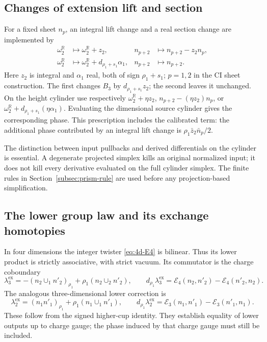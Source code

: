 \subsection{Changes of extension lift and section}
For a fixed sheet $n_p$, an integral lift change and a real section change are implemented by
\begin{align}\label{eq:background-changes}
 \omega_2^{\mathbb R}&\longmapsto\omega_2^{\mathbb R}+z_2,
 &n_{p+2}&\longmapsto n_{p+2}-z_2n_p,\\
 \omega_2^{\mathbb R}&\longmapsto\omega_2^{\mathbb R}
                              +d_{\rho_1+s_1}\alpha_1,
 &n_{p+2}&\longmapsto n_{p+2}.
\end{align}
Here $z_2$ is integral and $\alpha_1$ real, both of sign $\rho_1+s_1$; $p=1,2$ in the CI sheet construction. The first changes $B_3$ by $d_{\rho_1+s_1}z_2$; the second leaves it unchanged. On the height cylinder use respectively
$\omega_2^{\mathbb R}+\eta z_2$, $n_{p+2}-(\eta z_2)n_p$, or
$\omega_2^{\mathbb R}+d_{\rho_1+s_1}(\eta\alpha_1)$.
Evaluating the dimensional source cylinder gives the corresponding phase. This prescription includes the calibrated term: the additional phase contributed by an integral lift change is
$\rho_1\bar z_2\bar n_p/2$.

The distinction between input pullbacks and derived differentials on the cylinder is essential. A degenerate projected simplex kills an original normalized input; it does not kill every derivative evaluated on the full cylinder simplex. The finite rules in Section~\ref{subsec:prism-rule} are used before any projection-based simplification.

\subsection{The lower group law and its exchange homotopies}
In four dimensions the integer twister \eqref{eq:4d-E4} is bilinear. Thus its lower product is strictly associative, with strict vacuum. Its commutator is the charge coboundary
\begin{equation}\label{eq:lower-comm4}
 \lambda_3^{\mathrm{ex}}
 =-(n_2\cup_1n'_2)_{\rho_1}+\rho_1(n_2\cup_2n'_2),
 \qquad
 d_{\rho_1}\lambda_3^{\mathrm{ex}}
 =\mathcal E_4(n_2,n'_2)-\mathcal E_4(n'_2,n_2).
\end{equation}
The analogous three-dimensional lower correction is
\begin{equation}\label{eq:lower-comm3}
 \lambda_2^{\mathrm{ex}}
 =(n_1n'_1)_{\rho_1}+\rho_1(n_1\cup_1n'_1),
 \qquad
 d_{\rho_1}\lambda_2^{\mathrm{ex}}
 =\mathcal E_3(n_1,n'_1)-\mathcal E_3(n'_1,n_1).
\end{equation}
These follow from the signed higher-cup identity. They establish equality of lower outputs up to charge gauge; the phase induced by that charge gauge must still be included.

